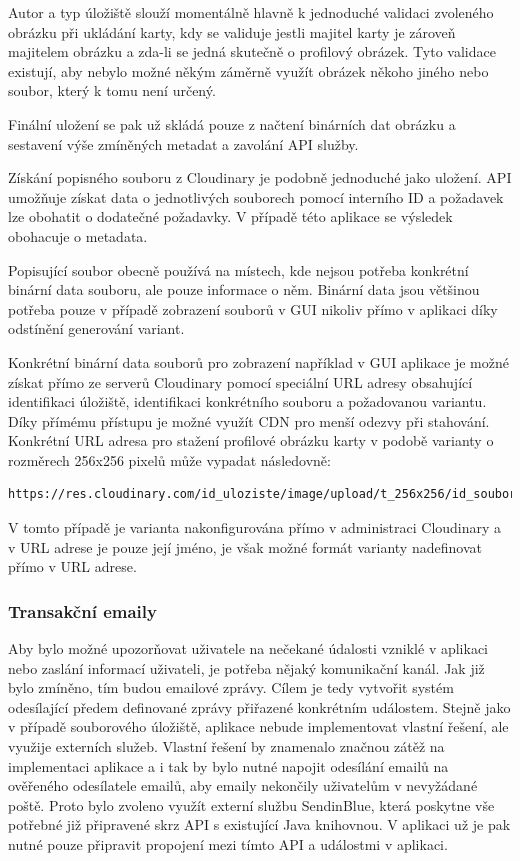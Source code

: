 		Autor a typ úložiště slouží momentálně hlavně k jednoduché validaci zvoleného obrázku při ukládání karty, kdy
		se validuje jestli majitel karty je zároveň majitelem obrázku a zda-li se jedná skutečně o profilový obrázek.
		Tyto validace existují, aby nebylo možné někým záměrně využít obrázek někoho jiného nebo soubor, který k tomu
		není určený.

		Finální uložení se pak už skládá pouze z načtení binárních dat obrázku a sestavení výše zmíněných metadat a zavolání \ac{API}
		služby.

		Získání popisného souboru z Cloudinary je podobně jednoduché jako uložení.
		\ac{API} umožňuje získat data o jednotlivých souborech pomocí interního ID a požadavek lze obohatit o dodatečné požadavky.
		V případě této aplikace se výsledek obohacuje o metadata.

		Popisující soubor obecně používá na místech, kde nejsou potřeba konkrétní binární data souboru, ale pouze
		informace o něm.
		Binární data jsou většinou potřeba pouze v případě zobrazení souborů v \ac{GUI} nikoliv přímo v aplikaci díky
		odstínění generování variant.

		Konkrétní binární data souborů pro zobrazení například v \ac{GUI} aplikace je možné získat přímo ze serverů
		Cloudinary pomocí speciální \ac{URL} adresy obsahující identifikaci úložiště, identifikaci konkrétního souboru a
		požadovanou variantu.
		Díky přímému přístupu je možné využít \ac{CDN} pro menší odezvy při stahování.
		Konkrétní \ac{URL} adresa pro stažení profilové obrázku karty v podobě varianty o rozměrech 256x256 pixelů může
		vypadat následovně:

		\begin{lstlisting}[caption={Ukázka URL adresy souboru v Cloudinary uložišti. Zdroj: [autor]}]
https://res.cloudinary.com/id_uloziste/image/upload/t_256x256/id_souboru
		\end{lstlisting}

		V tomto případě je varianta nakonfigurována přímo v administraci Cloudinary a v \ac{URL} adrese je pouze její jméno,
		je však možné formát varianty nadefinovat přímo v \ac{URL} adrese.

		\subsubsection{Transakční emaily}

		Aby bylo možné upozorňovat uživatele na nečekané údalosti vzniklé v aplikaci nebo zaslání informací uživateli,
		je potřeba nějaký komunikační kanál.
		Jak již bylo zmíněno, tím budou emailové zprávy.
		Cílem je tedy vytvořit systém odesílající předem definované zprávy přiřazené konkrétním událostem.
		Stejně jako v případě souborového úložiště, aplikace nebude implementovat vlastní řešení, ale využije externích
		služeb.
		Vlastní řešení by znamenalo značnou zátěž na implementaci aplikace a i tak by bylo nutné napojit odesílání
		emailů na ověřeného odesílatele emailů, aby emaily nekončily uživatelům v nevyžádané poště.
		Proto bylo zvoleno využít externí službu SendinBlue, která poskytne vše potřebné již připravené skrz \ac{API}
		s existující Java knihovnou.
		V aplikaci už je pak nutné pouze připravit propojení mezi tímto \ac{API} a událostmi v aplikaci.

